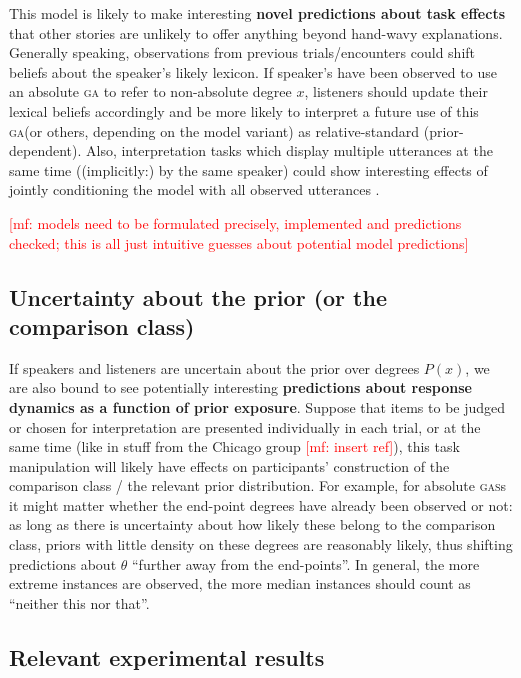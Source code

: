 \documentclass[fleqn,reqno,10pt]{article}
\newcommand{\acro}[1]{{\relsize{+1}\textsc{#1}}\xspace}
\newcommand{\acros}[1]{{\relsize{+1}\textsc{#1}}{\relsize{-1}s}\xspace}
\newcommand{\ga}{\acro{ga}}    %
\newcommand{\gas}{\acros{gas}} %
\newcommand{\mf}[1]{\textcolor{Red}{[mf: #1]}}
\begin{document}
This model is likely to make interesting \textbf{novel predictions about task effects} that
other stories are unlikely to offer anything beyond hand-wavy explanations. Generally speaking,
observations from previous trials/encounters could shift beliefs about the speaker's likely
lexicon. If speaker's have been observed to use an absolute \ga to refer to non-absolute degree
$x$, listeners should update their lexical beliefs accordingly and be more likely to interpret
a future use of this \ga (or others, depending on the model variant) as relative-standard
(prior-dependent). Also, interpretation tasks which display multiple utterances at the same
time ((implicitly:) by the same speaker) could show interesting effects of jointly conditioning
the model with all observed utterances \citep[as observed
by][]{TesslerFranke2018:Not-unreasonabl}.

\mf{models need to be formulated precisely, implemented and predictions checked; this is all
  just intuitive guesses about potential model predictions}

\subsection{Uncertainty about the prior (or the comparison class)}

If speakers and listeners are uncertain about the prior over degrees $P(x)$, we are also bound
to see potentially interesting \textbf{predictions about response dynamics as a function of
  prior exposure}. Suppose that items to be judged or chosen for interpretation are presented
individually in each trial, or at the same time (like in stuff from the Chicago group \citep{KimXiangKennedy:2014,LeffelXiangKennedy:2016}
\mf{insert ref}), this task manipulation will likely have effects on participants' construction
of the comparison class / the relevant prior distribution. For example, for absolute \gas it
might matter whether the end-point degrees have already been observed or not: as long as there
is uncertainty about how likely these belong to the comparison class, priors with little
density on these degrees are reasonably likely, thus shifting predictions about $\theta$
``further away from the end-points''. In general, the more extreme instances are observed, the
more median instances should count as ``neither this nor that''. 

\subsection{Relevant experimental results}
\end{document}
